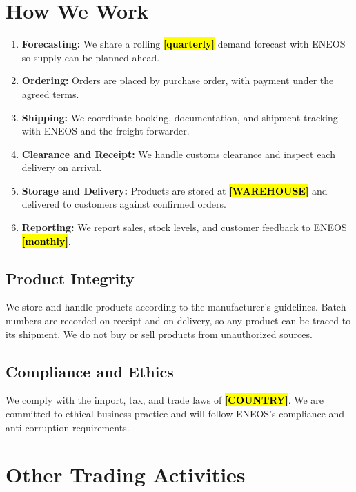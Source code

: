 \documentclass[11pt,letterpaper]{article}
\let\OmpOldSection\section
\renewcommand{\section}{\needspace{5\baselineskip}\OmpOldSection}
\let\OmpOldSubsection\subsection
\renewcommand{\subsection}{\needspace{4\baselineskip}\OmpOldSubsection}
\newcommand{\todo}[1]{{\color{black}\bfseries\hl{[#1]}}}
\begin{document}
\section{How We Work}

\begin{enumerate}
  \item \textbf{Forecasting:} We share a rolling \todo{quarterly} demand
        forecast with ENEOS so supply can be planned ahead.
  \item \textbf{Ordering:} Orders are placed by purchase order, with payment
        under the agreed terms.
  \item \textbf{Shipping:} We coordinate booking, documentation, and shipment
        tracking with ENEOS and the freight forwarder.
  \item \textbf{Clearance and Receipt:} We handle customs clearance and
        inspect each delivery on arrival.
  \item \textbf{Storage and Delivery:} Products are stored at
        \todo{WAREHOUSE} and delivered to customers against confirmed orders.
  \item \textbf{Reporting:} We report sales, stock levels, and customer
        feedback to ENEOS \todo{monthly}.
\end{enumerate}

\subsection*{Product Integrity}

We store and handle products according to the manufacturer's guidelines. Batch
numbers are recorded on receipt and on delivery, so any product can be traced
to its shipment. We do not buy or sell products from unauthorized sources.

\subsection*{Compliance and Ethics}

We comply with the import, tax, and trade laws of \todo{COUNTRY}. We are
committed to ethical business practice and will follow ENEOS's compliance and
anti-corruption requirements.

\section{Other Trading Activities}
\end{document}
